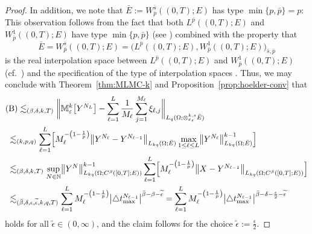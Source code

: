 \documentclass[reqno]{amsart}
\numberwithin{equation}{section}
\newcommand{\bbM}{\mathbb{M}}
\newcommand{\bbN}{\mathbb{N}}
\newcommand{\xkseps}{\otimes^{k,s}_{\varepsilon_s}}
\newcommand{\Mk}{\bbM^k_\varepsilon}
\theoremstyle{remark}
\theoremstyle{definition}
\begin{document}
\begin{proof}
	In addition, 
	we note that 
	$\bar{E} := W^{\bar{s}}_{\bar{p}}((0,T);E)$ has type 
	$\min\{p,\bar{p}\} = p$: 
	This observation follows from 
	the fact that both 
	$L^{\bar{p}}((0,T);E)$ 
	and 
	$W^1_{\bar{p}}((0,T);E)$ 
	have type $\min\{p,\bar{p}\}$ 
	(see \cite[Proposition~7.1.4]{AnalysisInBanachSpacesII2017})
	combined with the property that 
	\[
	\bar{E} 
	= 
	W^{\bar{s}}_{\bar{p}}((0,T);E) 
	= 
	\bigl( L^{\bar{p}}((0,T);E), 
	W^1_{\bar{p}}((0,T);E) \bigr)_{\bar{s},\bar{p}}
	\]
	is the real interpolation space 
	between $L^{\bar{p}}((0,T);E)$ 
	and 
	$W^1_{\bar{p}}((0,T);E)$ 
	(cf.~\cite[Theorem~2.5.17]{AnalysisInBanachSpacesI2016})
	and the specification of the type of 
	interpolation spaces 
	\cite[Proposition~7.1.3]{AnalysisInBanachSpacesII2017}.  
	Thus,  
	we may conclude 
	with Theorem~\ref{thm:MLMC-k} 
	and Proposition~\ref{prop:hoelder-conv} 
	that 
	\begin{align*} 
	&\text{(B)} 
	\lesssim_{(\beta,\delta,k,T)}
	\biggl\| 
	\Mk\bigl[Y^{N_L}\bigr] 
	-
	\sum_{\ell = 1}^{L} 
	\frac{1}{M_\ell} 
	\sum_{j=1}^{M_\ell}  
	\xi_{\ell,j}
	\biggr\|_{L_q(\Omega;\xkseps \bar{E} ) } 
	\\
	&\;\lesssim_{(k,p,q)}
	\sum_{\ell=1}^{L}   
	\Bigl[ 
	M_\ell^{-\left( 1-\frac{1}{p} \right)}  
	\bigl\| Y^{N_\ell} - Y^{N_{\ell-1}} 
	\bigr\|_{L_{kq}(\Omega; \bar{E} )} 
	\max_{1\leq\ell\leq L} 
	\bigl\| Y^{N_\ell} \bigr\|_{L_{kq}(\Omega; \bar{E} )}^{k-1}
	\Bigr]
	\\ 
	&\;\lesssim_{(\beta,\delta,k,T)} 
	\sup_{N\in\bbN} 
	\bigl\| Y^N \bigr\|_{L_{kq}(\Omega;C^\beta([0,T];E))}^{k-1}
	\sum_{\ell=1}^{L}   
	\Bigl[ 
	M_\ell^{-\left( 1-\frac{1}{p} \right)}  
	\bigl\| X - Y^{N_{\ell-1}} \bigr\|_{L_{kq}(\Omega;C^\beta([0,T];E))} 
	\Bigr] 
	\\ 
	&\;\lesssim_{(\bar{\beta},\delta,\epsilon,\widetilde{\epsilon},k,q,T)} 
	\sum_{\ell=1}^{L}   
	M_\ell^{-\left( 1-\frac{1}{p} \right)}  
	\bigl| \triangle t^{N_{\ell-1}}_{\max} 
	\bigr|^{\bar{\beta}-\beta-\widetilde{\epsilon}}
	=
	\sum_{\ell=1}^{L}   
	M_\ell^{-\left( 1-\frac{1}{p} \right)}  
	\bigl| \triangle t^{N_{\ell-1}}_{\max} 
	\bigr|^{\bar{\beta}-\delta-\frac{\epsilon}{2}-\widetilde{\epsilon}}
	\end{align*} 
	holds for all $\widetilde{\epsilon}\in(0,\infty)$, 
	and the claim follows 
	for the choice 
	$\widetilde{\epsilon}:=\frac{\epsilon}{2}$. 
\end{proof}   
\end{document}

